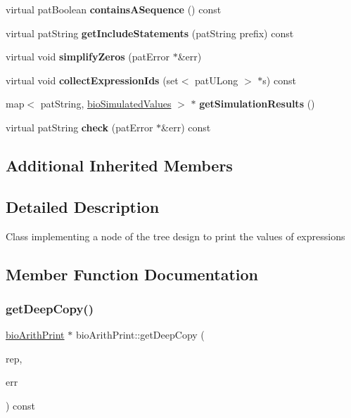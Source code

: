 \begin{DoxyCompactItemize}
virtual pat\+Boolean {\bfseries contains\+A\+Sequence} () const
\item 
\mbox{\label{classbio_arith_print_a6dd938822f23961c70730837a87fd385}} 
virtual pat\+String {\bfseries get\+Include\+Statements} (pat\+String prefix) const
\item 
\mbox{\label{classbio_arith_print_adb79fc0f7bca600e0371c3056588f13e}} 
virtual void {\bfseries simplify\+Zeros} (pat\+Error $\ast$\&err)
\item 
\mbox{\label{classbio_arith_print_ad0cadb289e58e7035ce22b9732a1a624}} 
virtual void {\bfseries collect\+Expression\+Ids} (set$<$ pat\+U\+Long $>$ $\ast$s) const
\item 
\mbox{\label{classbio_arith_print_ae6d141de8ae4526a438e58becc1cc1df}} 
map$<$ pat\+String, \hyperlink{classbio_simulated_values}{bio\+Simulated\+Values} $>$ $\ast$ {\bfseries get\+Simulation\+Results} ()
\item 
\mbox{\label{classbio_arith_print_adf09e74d63863554a7c7c1eaa53175f9}} 
virtual pat\+String {\bfseries check} (pat\+Error $\ast$\&err) const
\end{DoxyCompactItemize}
\subsection*{Additional Inherited Members}


\subsection{Detailed Description}
Class implementing a node of the tree design to print the values of expressions 

\subsection{Member Function Documentation}
\mbox{\label{classbio_arith_print_a1a04e77640bd147c7a10d450d779ef1b}} 
\subsubsection{\texorpdfstring{get\+Deep\+Copy()}{getDeepCopy()}}
{\footnotesize\ttfamily \hyperlink{classbio_arith_print}{bio\+Arith\+Print} $\ast$ bio\+Arith\+Print\+::get\+Deep\+Copy (\begin{DoxyParamCaption}\item[{\hyperlink{classbio_expression_repository}{bio\+Expression\+Repository} $\ast$}]{rep,  }\item[{pat\+Error $\ast$\&}]{err }\end{DoxyParamCaption}) const\hspace{0.3cm}{\ttfamily [virtual]}}

